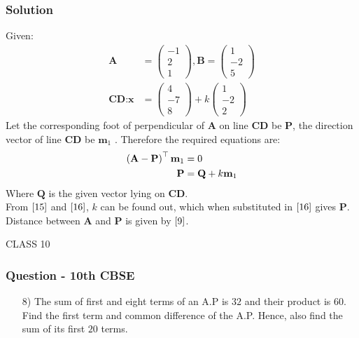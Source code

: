 \documentclass{beamer}
\begin{document}
\begin{frame}
\frametitle{Solution}
Given:
\begin{align}
    \textbf{A} &= \begin{pmatrix}
        -1\\
        2\\
        1
    \end{pmatrix},
    \textbf{B} = \begin{pmatrix}
        1\\
        -2\\
        5
    \end{pmatrix}\\
    \textbf{CD}:\textbf{x} &= \begin{pmatrix}
        4\\
        -7\\
        8
    \end{pmatrix}
    +k\begin{pmatrix}
        1\\
        -2\\
        2
    \end{pmatrix}
\end{align}
Let the corresponding foot of perpendicular of $\textbf{A}$ on line $\textbf{CD}$ be $\textbf{P}$, the direction vector of line $\textbf{CD}$ be $\textbf{m}_1$ . Therefore the required equations are:
\begin{align}
    \left(\textbf{A}-\textbf{P}\right)^{\top} \textbf{m}_1 &= 0 \label{15}\\
    \textbf{P} &= \textbf{Q} + k\textbf{m}_1 \label{16}
\end{align}
Where $\textbf{Q}$ is the given vector lying on $\textbf{CD}$.\\
From $\eqref{15}$ and $\eqref{16}$, $k$ can be found out, which when substituted in $\eqref{16}$ gives $\textbf{P}$. Distance between $\textbf{A}$ and $\textbf{P}$ is given by $\eqref{9}$.
    
\end{frame}








\begin{frame}[standout]
    CLASS 10
\end{frame}






\begin{frame}
\frametitle{Question - 10th CBSE}
\begin{enumerate}
    \item [8)]
The sum of first and eight terms of an A.P is $32$ and their product is $60$. Find the first term and common difference of the A.P. Hence, also find the sum of its first $20$ terms. 
\end{enumerate}
\end{frame}
\end{document}
